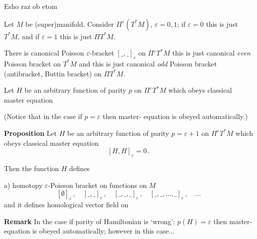 

\baselineskip=14pt
\def\vare {\varepsilon}
\def\t {\tilde}
\def\a {\alpha}
\def\K {{\bf K}}
\def\N {{\bf N}}
\def\C {{\cal C}}
\def\L {{\cal L}}
\def\E {{\cal E}}
\def\s {{\sigma}}
\def\S {{\Sigma}}
\def\p{\partial}
\def\vare{{\varepsilon}}
\def\Q {{\bf Q}}
\def\D {{\cal D}}
\def\G {{\Gamma}}
\def\Z {{\bf Z}}
\def\R  {{\bf R}}
\def\l {\lambda}
\def\ll {{\bf l}}
\def\degree {{\bf {\rm degree}\,\,}}
\def \finish {${\,\,\vrule height1mm depth2mm width 8pt}$}
\def \m {\medskip}
\def\p {\partial}
\def\r {{\bf r}}
\def\pt {{\bf p}}
\def\v {{\bf v}}
\def\n {{\bf n}}
\def\t {{\bf t}}
\def\b {{\bf b}}
\def\c {{\bf c }}
\def\e{{\bf e}}
\def\ac {{\bf a}}
\def \X   {{\bf X}}
\def \Y   {{\bf Y}}
\def \x   {{\bf x}}
\def \y   {{\bf y}}
\def\w {{\omega}}
\def \Tr  {{\rm Tr\,}}
\def\dim {{\rm dim\,\,}}
\def\t {{\tilde}} 
\def\dist {{\hbox{\tt "distance"}}}

\centerline {Esho raz ob etom}

Let $M$ be (super)manifold. Consider $\Pi^\vare(T^*M)$,
$\vare=0,1$; 
if $\vare=0$ this is just $T^*M$, and
if $\vare=1$ this is just $\Pi T^*M$.

  There is canonical Poisson $\vare$-bracket $[\_,\_]_\vare$ on $\Pi^\vare T^*M$
this is just canonical {\it even } Poisson  bracket  on $T^*M$
and  this is just canonical {\it odd } Poisson  bracket
(antibracket, Buttin bracket) on $\Pi T^*M$.

Let $H$ be an arbitrary function of parity  $p$ on $\Pi^\vare T^*M$
which obeys classical master equation


(Notice that in the case if $p=\vare$  then master- equation is obeyed 
automatically.)


  {\bf Proposition} 
Let $H$ be an arbitrary function of parity  $p=\vare+1$ 
on $\Pi^\vare T^*M$ which obeys classical master equation
                               $$
                         [H,H]_\vare=0\,.
                               $$ 

Then the function $H$ defines

a) homotopy $\vare$-Poisson bracket on functions on $M$
                  $$
   [\emptyset]_\vare\,,\quad
   [\_,\_]_\vare\,,\quad
   [\_,\_,\_]_\vare\,,\quad
   [\_,\_,\dots,\_]_\vare\,,\quad
    \dots
                  $$
and it defines homological vector field on



{\bf Remark}   In the case  if parity of Hamiltonian is `wrong':
 $p(H)=\vare$  then master-equation is obeyed automatically;
however in this case...


 
\def\m {{\bf m}}
\def\n {{\bf n}}

\bye
